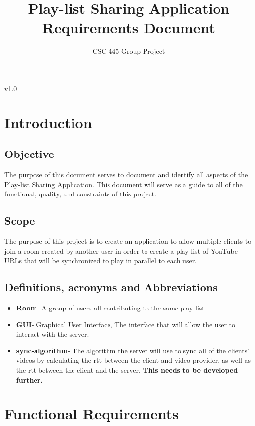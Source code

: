 \documentclass{article}
\title{Play-list Sharing Application Requirements Document}
\author{CSC 445 Group Project}
\begin{document}
\maketitle
\begin{center}v1.0\end{center}
\newpage
\tableofcontents
\newpage

\section{Introduction}

\subsection{Objective}
The purpose of this document serves to document and identify all aspects of the Play-list Sharing Application. This document will serve as a guide to all of the functional, quality, and constraints of this project.

\subsection{Scope}
The purpose of this project is to create an application to allow multiple clients to join a room created by another user in order to create a play-list of YouTube URLs that will be synchronized to play in parallel to each user.

\subsection{Definitions, acronyms and Abbreviations}

\begin{itemize}

\item \textbf{Room}- A group of users all contributing to the same play-list.
\item \textbf{GUI}- Graphical User Interface, The interface that will allow the user to interact with the server.
\item \textbf{sync-algorithm}- The algorithm the server will use to sync all of the clients' videos by calculating the rtt between the client and video provider, as well as the rtt between the client and the server.
\textbf{This needs to be developed further.}
\end{itemize}



\section{Functional Requirements}
\end{document}

